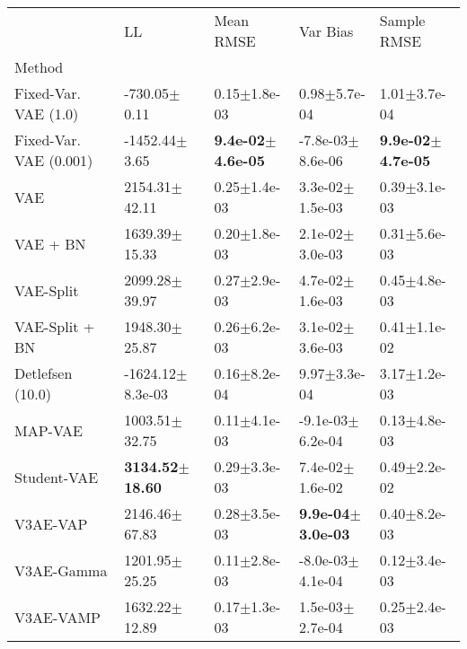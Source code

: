 \begin{tabular}{lllll}
\toprule
{} &                          LL &                     Mean RMSE &                      Var Bias &                   Sample RMSE \\
Method                 &                             &                               &                               &                               \\
\midrule
Fixed-Var. VAE (1.0)   &            -730.05$\pm$0.11 &              0.15$\pm$1.8e-03 &              0.98$\pm$5.7e-04 &              1.01$\pm$3.7e-04 \\
Fixed-Var. VAE (0.001) &           -1452.44$\pm$3.65 &  \textbf{9.4e-02$\pm$4.6e-05} &          -7.8e-03$\pm$8.6e-06 &  \textbf{9.9e-02$\pm$4.7e-05} \\
VAE                    &           2154.31$\pm$42.11 &              0.25$\pm$1.4e-03 &           3.3e-02$\pm$1.5e-03 &              0.39$\pm$3.1e-03 \\
VAE + BN               &           1639.39$\pm$15.33 &              0.20$\pm$1.8e-03 &           2.1e-02$\pm$3.0e-03 &              0.31$\pm$5.6e-03 \\
VAE-Split              &           2099.28$\pm$39.97 &              0.27$\pm$2.9e-03 &           4.7e-02$\pm$1.6e-03 &              0.45$\pm$4.8e-03 \\
VAE-Split + BN         &           1948.30$\pm$25.87 &              0.26$\pm$6.2e-03 &           3.1e-02$\pm$3.6e-03 &              0.41$\pm$1.1e-02 \\
Detlefsen (10.0)       &        -1624.12$\pm$8.3e-03 &              0.16$\pm$8.2e-04 &              9.97$\pm$3.3e-04 &              3.17$\pm$1.2e-03 \\
MAP-VAE                &           1003.51$\pm$32.75 &              0.11$\pm$4.1e-03 &          -9.1e-03$\pm$6.2e-04 &              0.13$\pm$4.8e-03 \\
Student-VAE            &  \textbf{3134.52$\pm$18.60} &              0.29$\pm$3.3e-03 &           7.4e-02$\pm$1.6e-02 &              0.49$\pm$2.2e-02 \\
V3AE-VAP               &           2146.46$\pm$67.83 &              0.28$\pm$3.5e-03 &  \textbf{9.9e-04$\pm$3.0e-03} &              0.40$\pm$8.2e-03 \\
V3AE-Gamma             &           1201.95$\pm$25.25 &              0.11$\pm$2.8e-03 &          -8.0e-03$\pm$4.1e-04 &              0.12$\pm$3.4e-03 \\
V3AE-VAMP              &           1632.22$\pm$12.89 &              0.17$\pm$1.3e-03 &           1.5e-03$\pm$2.7e-04 &              0.25$\pm$2.4e-03 \\

\end{tabular}
